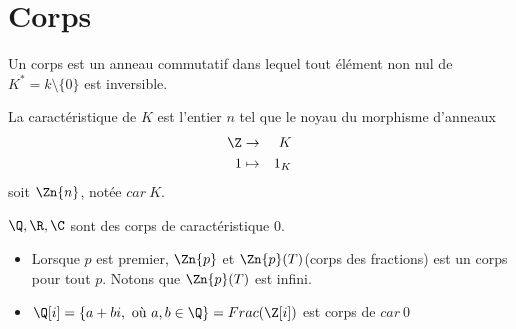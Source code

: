 \section{Corps}


\begin{definition}
	Un corps est un anneau commutatif dans lequel tout élément non nul de $K^* = k \setminus \{0\}$ est inversible.
\end{definition}

\begin{definition}
	La caractéristique de $K$ est l'entier $n$ tel que le noyau du morphisme d'anneaux
	\begin{eqnarray*}
		\Z &\to& K \\
		1 &\mapsto& 1_K
	\end{eqnarray*}
	soit $\Zn{n}$, notée $car \ K$.
\end{definition}

\begin{example}
	$\Q, \R, \C$ sont des corps de caractéristique 0.
	\begin{itemize}
		\item Lorsque $p$ est premier, $\Zn{p}$ et $\Zn{p}(T)$(corps des fractions) est un corps pour tout $p$. Notons que $\Zn{p}(T)$ est infini.
		\item $\Q[i] = \left\{ a + bi, \text{ où } a,b \in \Q\right\} = Frac (\Z[i])$ est corps de $car\ 0$
	\end{itemize}
\end{example}



